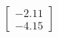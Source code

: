 \documentclass[preview]{standalone}
\begin{document}
\begin{align*}
\begin{bmatrix} -2.11 \\ -4.15 \end{bmatrix}
\end{align*}
\end{document}
